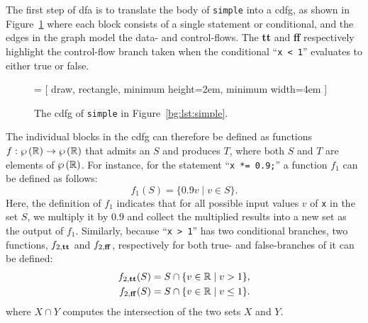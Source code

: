The first step of \gls{dfa} is to translate the body of \verb|simple| into a
\gls{cdfg}, as shown in Figure~\ref{bg:fig:cdfg} where each block consists of
a single statement or conditional, and the edges in the graph model the data-
and control-flows.  The \textbf{tt} and \textbf{ff} respectively highlight
the control-flow branch taken when the conditional \mbox{``\texttt{x < 1}''}
evaluates to either true or false.
\begin{figure}[ht]
    \centering
     = [
        draw, rectangle, minimum height=2em, minimum width=4em
    ]
    \caption{%
        The \gls{cdfg} of \texttt{simple} in Figure~\ref{bg:lst:simple}.
    }\label{bg:fig:cdfg}
\end{figure}

The individual blocks in the \gls{cdfg} can therefore be defined as functions
$f: \wp\left({\mathbb{R}}\right) \to \wp\left({\mathbb{R}}\right)$ that admits an $S$ and
produces $T$, where both $S$ and $T$ are elements of $\wp\left({\mathbb{R}}\right)$.
For instance, for the statement ``\texttt{x *= 0.9;}'' a function $f_1$ can be
defined as follows:
\begin{equation}
    f_1(S) = \{ 0.9 v \mid v \in S \}.
\end{equation}
Here, the definition of $f_1$ indicates that for all possible input values
$v$ of \verb|x| in the set $S$, we multiply it by $0.9$ and collect the
multiplied results into a new set as the output of $f_1$.  Similarly, because
\mbox{``\texttt{x > 1}''} has two conditional branches, two functions,
$f_{2,\mathbf{tt}}$ and $f_{2, \mathbf{ff}}$, respectively for both true- and
false-branches of it can be defined:
\begin{equation}
    \begin{aligned}
        f_{2, \mathbf{tt}}(S) &= S \cap \{ v \in \mathbb{R} \mid v > 1 \}, \\
        f_{2, \mathbf{ff}}(S) &= S \cap \{ v \in \mathbb{R} \mid v \leq 1 \}.
    \end{aligned}
\end{equation}
where $X \cap Y$ computes the intersection of the two sets $X$ and $Y$.

